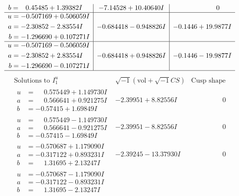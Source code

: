 \documentclass[1p]{elsarticle_modified}
\theoremstyle{definition}
\newcommand{\I}{\sqrt{-1}}
\begin{document}
$$\begin{array}{c|c|c}
\begin{aligned}
b &= \phantom{-}0.45485 + 1.39382 I\end{aligned}
 & -7.14528 + 10.40640 I & \phantom{-0.000000 } 0 \\ \hline\begin{aligned}
u &= -0.507169 + 0.506059 I \\
a &= -2.30852 - 2.83554 I \\
b &= -1.296690 + 0.107271 I\end{aligned}
 & -0.684418 - 0.948826 I & -0.1446 + 19.9877 I \\ \hline\begin{aligned}
u &= -0.507169 - 0.506059 I \\
a &= -2.30852 + 2.83554 I \\
b &= -1.296690 - 0.107271 I\end{aligned}
 & -0.684418 + 0.948826 I & -0.1446 - 19.9877 I\\
 \hline 
 \end{array}$$\newpage$$\begin{array}{c|c|c}  
\text{Solutions to }I^u_{1}& \I (\text{vol} + \sqrt{-1}CS) & \text{Cusp shape}\\
 \hline 
\begin{aligned}
u &= \phantom{-}0.575449 + 1.149730 I \\
a &= \phantom{-}0.566641 + 0.921275 I \\
b &= -0.57415 + 1.69849 I\end{aligned}
 & -2.39951 + 8.82556 I & \phantom{-0.000000 } 0 \\ \hline\begin{aligned}
u &= \phantom{-}0.575449 - 1.149730 I \\
a &= \phantom{-}0.566641 - 0.921275 I \\
b &= -0.57415 - 1.69849 I\end{aligned}
 & -2.39951 - 8.82556 I & \phantom{-0.000000 } 0 \\ \hline\begin{aligned}
u &= -0.570687 + 1.179090 I \\
a &= -0.317122 + 0.893231 I \\
b &= \phantom{-}1.31695 + 2.13247 I\end{aligned}
 & -2.39245 - 13.37930 I & \phantom{-0.000000 } 0 \\ \hline\begin{aligned}
u &= -0.570687 - 1.179090 I \\
a &= -0.317122 - 0.893231 I \\
b &= \phantom{-}1.31695 - 2.13247 I\end{aligned}

\end{array}$$
\end{document}
